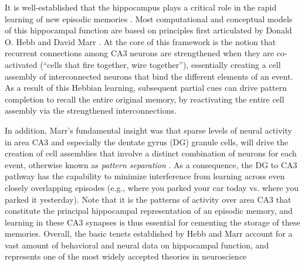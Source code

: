 \documentclass[11pt,twoside]{article}
\newif\myifpdf
\begin{document}
It is well-established that the hippocampus plays a critical role in the rapid learning of new episodic memories \citep{EichenbaumYonelinasRanganath07}.  Most computational and conceptual models of this hippocampal function are based on principles first articulated by Donald O. Hebb and David Marr \citep{Hebb49,Marr71,McNaughtonNadel90,McClellandMcNaughtonOReilly95}.  At the core of this framework is the notion that recurrent connections among CA3 neurons are strengthened when they are co-activated (``cells that fire together, wire together''), essentially creating a cell assembly of interconnected neurons that bind the different elements of an event.  As a result of this Hebbian learning, subsequent partial cues can drive pattern completion to recall the entire original memory, by reactivating the entire cell assembly via the strengthened interconnections.

In addition, Marr's fundamental insight was that sparse levels of neural activity in area CA3 and especially the dentate gyrus (DG) granule cells, will drive the creation of cell assemblies that involve a distinct combination of neurons for each event, otherwise known as \emph{pattern separation} \citep{Marr71,OReillyMcClelland94,YassaStark11}.  As a consequence, the DG to CA3 pathway has the capability to minimize interference from learning across even closely overlapping episodes (e.g., where you parked your car today vs. where you parked it yesterday).  Note that it is the patterns of activity over area CA3 that constitute the principal hippocampal representation of an episodic memory, and learning in these CA3 synapses is thus essential for cementing the storage of these memories.  Overall, the basic tenets established by Hebb and Marr account for a vast amount of behavioral and neural data on hippocampal function, and represents one of the most widely accepted theories in neuroscience \citep{MilnerSquireKandel98,OReillyBhattacharyyaHowardEtAl14,Eichenbaum16,YonelinasRanganathEkstromEtAl19}
 
\end{document}
